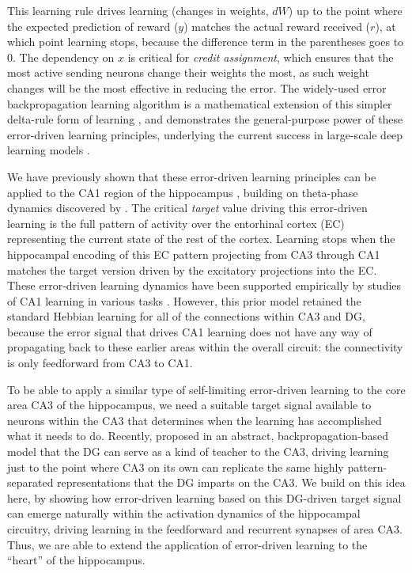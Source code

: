\documentclass[11pt,twoside]{article}
\newif\myifpdf
\begin{document}
This learning rule drives learning (changes in weights, $dW$) up to the point where the expected prediction of reward ($y$) matches the actual reward received ($r$), at which point learning stops, because the difference term in the parentheses goes to 0. The dependency on $x$ is critical for \emph{credit assignment}, which ensures that the most active sending neurons change their weights the most, as such weight changes will be the most effective in reducing the error.  The widely-used error backpropagation learning algorithm is a mathematical extension of this simpler delta-rule form of learning \citep{RumelhartHintonWilliams86}, and demonstrates the general-purpose power of these error-driven learning principles, underlying the current success in large-scale deep learning models \citep{LeCunBengioHinton15}.

We have previously shown that these error-driven learning principles can be applied to the CA1 region of the hippocampus \citep{KetzMorkondaOReilly13}, building on theta-phase dynamics discovered by \citet{HasselmoBodelonWyble02}.  The critical \emph{target} value driving this error-driven learning is the full pattern of activity over the entorhinal cortex (EC) representing the current state of the rest of the cortex.  Learning stops when the hippocampal encoding of this EC pattern projecting from CA3 through CA1 matches the target version driven by the excitatory projections into the EC.  These error-driven learning dynamics have been supported empirically by studies of CA1 learning in various tasks \citep{SchapiroTurk-BrowneNormanEtAl16,SchapiroTurk-BrowneBotvinickEtAl17}.  However, this prior model retained the standard Hebbian learning for all of the connections within CA3 and DG, because the error signal that drives CA1 learning does not have any way of propagating back to these earlier areas within the overall circuit: the connectivity is only feedforward from CA3 to CA1.

To be able to apply a similar type of self-limiting error-driven learning to the core area CA3 of the hippocampus, we need a suitable target signal available to neurons within the CA3 that determines when the learning has accomplished what it needs to do.  Recently, \citet{KowadloAhmedRawlinson20} proposed in an abstract, backpropagation-based model that the DG can serve as a kind of teacher to the CA3, driving learning just to the point where CA3 on its own can replicate the same highly pattern-separated representations that the DG imparts on the CA3.  We build on this idea here, by showing how error-driven learning based on this DG-driven target signal can emerge naturally within the activation dynamics of the hippocampal circuitry, driving learning in the feedforward and recurrent synapses of area CA3.  Thus, we are able to extend the application of error-driven learning to the ``heart'' of the hippocampus.
\end{document}
